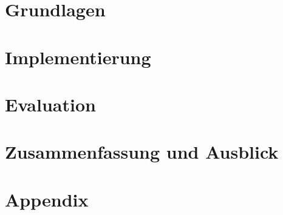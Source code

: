 \documentclass[a4paper,12pt,oneside]{report}
\begin{document}
\begin{sloppypar}









\setcounter{page}{0} %


\part{Grundlagen}\label{pt:glrundlagen}


\part{Implementierung}\label{pt:implementierung}


\part{Evaluation}\label{pt:evaluation}


\part{Zusammenfassung und Ausblick}\label{pt:zua}


\part{Appendix}\label{pt:appendix}
\printbibliography

\end{sloppypar}
\end{document}

